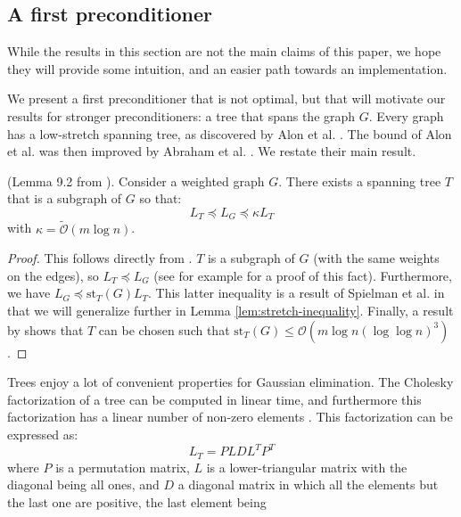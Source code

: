 


\subsection{A first preconditioner\label{sec:A-first-preconditioner}}

While the results in this section are not the main claims of this
paper, we hope they will provide some intuition, and an easier path
towards an implementation.

We present a first preconditioner that is not optimal, but that will
motivate our results for stronger preconditioners: a tree that spans
the graph $G$. Every graph has a low-stretch spanning tree, as discovered
by Alon et al. \cite{Alon1995}. The bound of Alon et al. was then
improved by Abraham et al. \cite{Abraham2008}. We restate their main
result.
\begin{lemma}
(Lemma 9.2 from \cite{Spielman2009a}). Consider a weighted graph
$G$. There exists a spanning tree $T$ that is a subgraph of $G$
so that: 
\[
L_{T}\preceq L_{G}\preceq\kappa L_{T}
\]
with $\kappa=\tilde{\mathcal{O}}\left(m\log n\right)$. %
\label{lem:tree-st} \end{lemma}
\begin{proof}
This follows directly from \cite{Spielman2009a}. $T$ is a subgraph
of $G$ (with the same weights on the edges), so $L_{T}\preceq L_{G}$
(see \cite{Spielman2009a} for example for a proof of this fact).
Furthermore, we have $L_{G}\preceq\text{st}_{T}\left(G\right)L_{T}$.
This latter inequality is a result of Spielman et al. in \cite{Spielman2010}
that we will generalize further in Lemma \ref{lem:stretch-inequality}. Finally,
a result by \cite{Abraham2008} shows that $T$ can be chosen such
that $\text{st}_{T}\left(G\right)\leq\mathcal{O}(m\log n(\log\log n)^{3})$.
\end{proof}
Trees enjoy a lot of convenient properties for Gaussian elimination.
The Cholesky factorization of a tree can be computed in linear time,
and furthermore this factorization has a linear number of non-zero
elements \cite{Spielman2009a}. This factorization can be expressed
as: 
\[
L_{T}=PLDL^{T}P^{T}
\]
where $P$ is a permutation matrix, $L$ is a lower-triangular matrix
with the diagonal being all ones, and $D$ a diagonal matrix in which
all the elements but the last one are positive, the last element being
